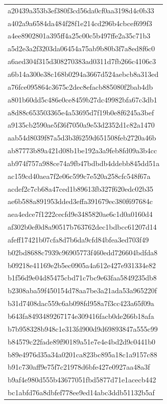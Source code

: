 \begin{tabular}{l}
a20439a353b3ef380f3cd56da0cf0aa3198d4c0b33 \\
a402a9a6584da484f28f1e214cd296b4cbcef699f3 \\
a4ee8902801a395ff4a25c00c5b497ffe2a35c71b3 \\
a5d2e3a2f3203da06454a75ab9b80b3f7a8ed8f6c0 \\
a6aed304f315d308270383ad0311d7fb266c4106c3 \\
a6b14a300e38c168b0294a3667d524aebcb8a313ed \\
a76fce095864c3675c2dec8efacb885080f2bab4db \\
a801b60dd5c486e0ce8459b27dc49982bfa67c3db1 \\
a8d88c653503365e4a53695d7f19b0e8f6245a3bef \\
a9135cb2590ae5f36f7050a9e53d2352d1c82a1470 \\
aab54d8039f87a5d3b3f6259d651508feb2720a46b \\
ab87773b89a421d08b1be192a3a9feb8fd09a3b4cc \\
ab974f757a988ce74a9fb47bdbdb4ddebb845dd51a \\
ac159cd40aea7f2e06c599c7e520a258cfc548f67a \\
acdef2c7cb68a47ced1b89613fb327f620edc02b35 \\
ae6b588a891953dded3effa391679ec380f697684c \\
aea4edce7f1222cecfd9e3485820ae6c1d0a0160d4 \\
af302b0ef0d8a90517b763762dec1bdbcc61207d14 \\
afeff17421b07cfa8d7b6da9cfd84bfea3ed703f49 \\
b02bd8688c7939c96905773f460edd726604bdfda8 \\
b09218e41169e2b5ec0905a4a612e427e931334e82 \\
b1f56d9e04d85475cbd71c7bc9e63faa5849235db8 \\
b2308aba59f450154d78aa7be3a21ada53a965220f \\
b31d7408dac559c6ab098fd958a7f3cc423a65f09a \\
b643fa8493489267174e309416facb0de266b18afa \\
b7b958328b948c1e313fd900d9d69893847a555c99 \\
b84579c22fade89f90189a51e7e4e4bd2d9c0441b0 \\
b89e4976d35a34a0201ca823bc895a18c1a9157c88 \\
b91c730aff9e75f7c21978d6bfe427e0927aa48a3f \\
b9af4e980d555b43677051fbd5877d71e1acecb442 \\
bc1abfd76a8dbfef778ee9ed14abc3ddb51132b5af \\

\end{tabular}
